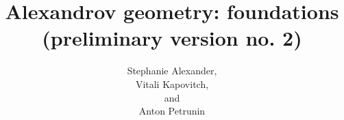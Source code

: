 \frontmatter
\title{Alexandrov geometry: foundations\\
{\large (preliminary version no. 2)}}
\date{}
\author{Stephanie Alexander,\\ Vitali Kapovitch,\\ and\\ Anton Petrunin}
\maketitle
